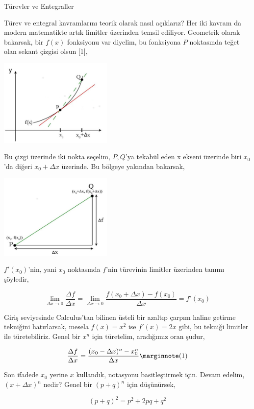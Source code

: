 \documentclass[12pt,fleqn]{article}\usepackage{../../common}
\begin{document}
Türevler ve Entegraller

Türev ve entegral kavramlarını teorik olarak nasıl açıklarız? Her iki kavram da
modern matematikte artık limitler üzerinden temsil ediliyor. Geometrik olarak
bakarsak, bir $f(x)$ fonksiyonu var diyelim, bu fonksiyona $P$ noktasında
teğet olan sekant çizgisi olsun [1],

\includegraphics[width=15em]{ode_mattuck_65_diffint1_01.jpg}

Bu çizgi üzerinde iki nokta seçelim, $P,Q$'ya tekabül eden x ekseni üzerinde
biri $x_0$'da diğeri $x_0 + \Delta x$ üzerinde. Bu bölgeye yakından bakarsak,

\includegraphics[width=15em]{ode_mattuck_65_diffint1_02.jpg}

$f'(x_0)$'nin, yani $x_0$ noktasında $f$'nin türevinin limitler üzerinden tanımı
şöyledir,

$$
\lim_{\Delta x \to 0} \frac{\Delta f}{\Delta x} =
\lim_{\Delta x \to 0} \frac{f(x_0 + \Delta x) - f(x_0)}{\Delta x} =
f'(x_0)
$$

Giriş seviyesinde Calculus'tan bilinen üsteli bir azaltıp çarpım haline getirme
tekniğini hatırlarsak, mesela $f(x) = x^2$ ise $f'(x) = 2x$ gibi, bu tekniği
limitler ile türetebiliriz. Genel bir $x^n$ için türetelim, aradığımız oran
şudur,

$$
\frac{\Delta f}{\Delta x} = \frac{(x_0-\Delta x)^n - x_0^n}{\Delta x}
\mlabel{1}
$$

Son ifadede $x_0$ yerine $x$ kullandık, notasyonu basitleştirmek için. Devam
edelim, $(x+\Delta x)^n$ nedir? Genel bir $(p + q)^n$ için düşünürsek,

$$
(p+q)^2 = p^2 + 2pq + q^2
$$
\end{document}
